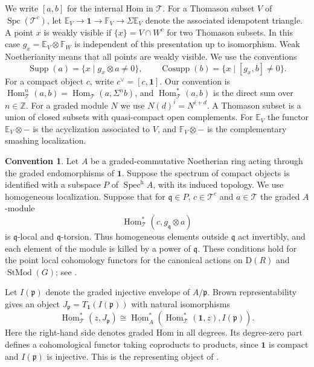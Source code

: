 \documentclass[11pt,reqno]{amsart}
\theoremstyle{definition}
\newtheorem{convention}[theorem]{Convention}
\DeclareMathOperator{\Cosupp}{Cosupp}
\DeclareMathOperator{\Supp}{Supp}
\DeclareMathOperator{\Spc}{Spc}
\DeclareMathOperator{\Spec}{Spec}
\DeclareMathOperator{\Hom}{Hom}
\DeclareMathOperator{\StMod}{StMod}
\newcommand{\T}{\mathcal T}
\newcommand{\D}{\mathrm D}
\newcommand{\one}{\mathbf 1}
\newcommand{\p}{\mathfrak p}
\newcommand{\q}{\mathfrak q}
\numberwithin{equation}{section}
\begin{document}
We write $[a,b]$ for the internal Hom in $\T$. For a Thomason subset $V$ of $\Spc(\T^c)$, let $\mathbb{E}_V\to\one\to \mathbb{F}_V\to\Sigma \mathbb{E}_V$ denote the associated idempotent triangle. A point $x$ is weakly visible if $\{x\}=V\cap W^c$ for two Thomason subsets. In this case $g_x=\mathbb{E}_V\otimes \mathbb{F}_W$ is independent of this presentation up to isomorphism. Weak Noetherianity means that all points are weakly visible. We use the conventions
\[
 \Supp(a)=\{x\mid g_x\otimes a\ne0\},\qquad
 \Cosupp(b)=\{x\mid[g_x,b]\ne0\}.
\]
For a compact object $c$, write $c^\vee=[c,\one]$. Our convention is $\Hom^n_{\T}(a,b)=\Hom_{\T}(a,\Sigma^n b)$, and $\Hom^*_{\T}(a,b)$ is the direct sum over $n\in\mathbb Z$. For a graded module $N$ we use $N(d)^i=N^{i+d}$. A Thomason subset is a union of closed subsets with quasi-compact open complements. For $\mathbb{E}_V$ the functor $\mathbb{E}_V\otimes-$ is the acyclization associated to $V$, and $\mathbb{F}_V\otimes-$ is the complementary smashing localization.

\begin{convention}\label{conv}
Let $A$ be a graded-commutative Noetherian ring acting through the graded endomorphisms of $\one$. Suppose the spectrum of compact objects is identified with a subspace $P$ of $\Spec^{\mathrm h}A$, with its induced topology. We use homogeneous localization. Suppose that for $\q\in P$, $c\in\T^c$ and $a\in\T$ the graded $A$-module
\[
 \Hom^*_{\T}(c,g_{\q}\otimes a)
\]
is $\q$-local and $\q$-torsion. Thus homogeneous elements outside $\q$ act invertibly, and each element of the module is killed by a power of $\q$. These conditions hold for the point local cohomology functors for the canonical actions on $\D(R)$ and $\StMod(G)$; see \cite{bik,bikp}.
\end{convention}

Let $I(\p)$ denote the graded injective envelope of $A/\p$. Brown representability gives an object $J_{\p}=T_{\one}(I(\p))$ with natural isomorphisms
\begin{equation}\label{e:brown}
 \Hom_{\T}^*(z,J_{\p})\cong
 \underline{\Hom}_A^*(\Hom^*_{\T}(\one,z),I(\p)).
\end{equation}
Here the right-hand side denotes graded Hom in all degrees. Its degree-zero part defines a cohomological functor taking coproducts to products, since $\one$ is compact and $I(\p)$ is injective. This is the representing object of \cite[(5.3)]{bik}.
\end{document}
